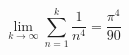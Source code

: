 

\fontsize{25}{25}\selectfont
\[
            
            
            
            
           \lim_{k \to \infty} \sum_{n = 1}^{k}
           \frac{1}{n^{4}} = \frac{\pi^{4}}{90}



            
            
            
            
            
            
\]


